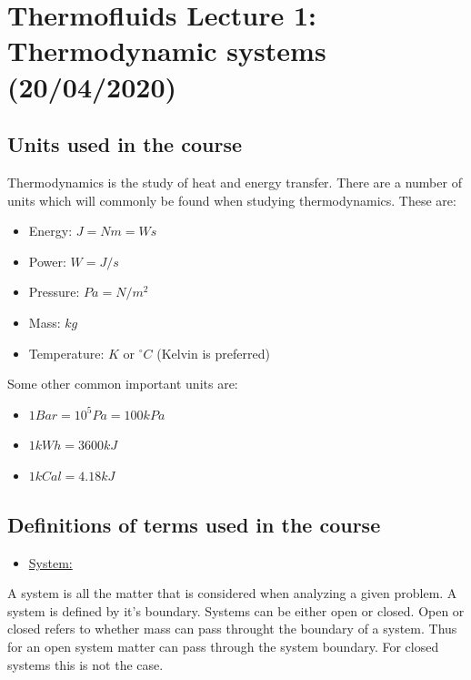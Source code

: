 \documentclass[11pt, a4paper]{article}
\begin{document}
\section{Thermofluids Lecture 1: Thermodynamic systems (20/04/2020)}


\subsection{Units used in the course}
Thermodynamics is the study of heat and energy transfer. There are a number of units which will commonly be found when studying thermodynamics. These are:
\begin{itemize}
  \item Energy: $J = Nm = Ws$
  \item Power: $W = J/s$
  \item Pressure: $Pa = N/m^2$
  \item Mass: $kg$
  \item Temperature: $K$ or $^\circ C$ (Kelvin is preferred)
\end{itemize}
Some other common important units are:
\begin{itemize}
  \item $1 Bar = 10^5 Pa = 100 kPa$
  \item $1 kWh = 3600 kJ$
  \item $1 kCal = 4.18 kJ$
\end{itemize}


\subsection{Definitions of terms used in the course}
\begin{itemize}
  \item \underline{System:}
\end{itemize}
A system is all the matter that is considered when analyzing a given problem. A system is defined by it's boundary. Systems can be either open or closed. Open or closed refers to whether mass can pass throught the boundary of a system. Thus for an open system matter can pass through the system boundary. For closed systems this is not the case.\\
\end{document}
